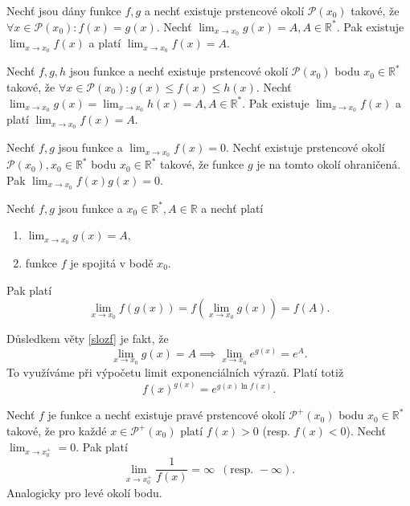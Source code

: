 \begin{veta}
Nechť jsou dány funkce $f,g$ a nechť existuje prstencové okolí
$\mathscr P(x_0)$ takové, že $\forall x \in \mathscr P(x_0):f(x)=g(x).$
Nechť $\lim_{x\to x_0}g(x)=A, A\in \mathbb R^*.$ Pak existuje $\lim_{x\to x_0}f(x)$
a platí $\lim_{x\to x_0}f(x)=A.$
\end{veta}

\begin{veta}
Nechť $f,g,h$ jsou funkce a nechť existuje prstencové okolí $\mathscr P(x_0)$
bodu $x_0\in \mathbb R^*$ takové, že $\forall x \in \mathscr P(x_0):g(x)\leq f(x)\leq h(x).$
Nechť $\lim_{x\to x_0}g(x)=\lim_{x\to x_0}h(x)=A, A \in \mathbb R^*.$ Pak existuje
$\lim_{x\to x_0}f(x)$ a  platí $ \lim_{x\to x_0}f(x) = A.$
\end{veta}

\begin{veta}
Nechť $f,g$ jsou funkce a $\lim_{x\to x_0}f(x)=0.$ Nechť existuje prstencové
okolí $\mathscr P(x_0), x_0\in \mathbb R^*$ bodu $x_0\in \mathbb R^*$ takové, že
funkce $g$ je na tomto okolí ohraničená. Pak $\lim_{x\to x_0}f(x)g(x)=0.$
\end{veta}

\begin{veta}\label{slozf}
Nechť $f,g$ jsou funkce a $x_0\in \mathbb R^*, A \in \mathbb R$ a nechť platí
\begin{enumerate}[$i.$]
\item $\lim_{x\to x_0}g(x)=A,$
\item funkce $f$ je spojitá v bodě $x_0.$
\end{enumerate}
Pak platí
$$\lim_{x\to x_0}f \left ( g(x) \right ) =f \left ( \lim_{x\to x_0}g(x) \right ) =f(A).$$
\end{veta}

\begin{pozn}
    Důsledkem věty \ref{slozf} je fakt, že
    $$\lim_{x\to x_0}g(x)=A \implies \lim_{x\to x_0}e^{g(x)}=e^A.$$
    To využíváme při výpočetu limit exponenciálních výrazů. Platí totiž
    $$f(x)^{g(x)}=e^{g(x)\ln f(x)}.$$
\end{pozn}

\begin{veta}
Nechť $f$ je funkce a nechť existuje pravé prstencové okolí $\mathscr P^+(x_0)$ bodu
$x_0\in \mathbb R^*$ takové, že pro každé $x\in \mathscr P^+(x_0)$ platí
$f(x)>0$ (resp. $f(x)<0$). Nechť $\lim_{x\to x_0^+}=0.$ Pak platí
$$\lim_{x\to x_0^+} \frac{1}{f(x)}=\infty \,\,\, (\textrm{resp. } -\infty).$$
Analogicky pro levé okolí bodu.
\end{veta}

